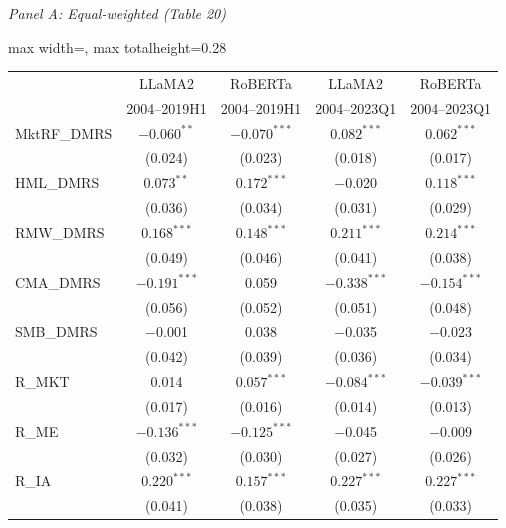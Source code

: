 \begin{table}[htbp]
{\footnotesize
\textit{Panel A: Equal-weighted (Table 20)}\\[2pt]
\begin{adjustbox}{max width=\linewidth, max totalheight=0.28\textheight}
\begin{tabular}{lcccc}
\toprule
 & LLaMA2 & RoBERTa & LLaMA2 & RoBERTa \\
 & 2004--2019H1 & 2004--2019H1 & 2004--2023Q1 & 2004--2023Q1 \\
\midrule
MktRF\_DMRS & $-0.060^{**}$ & $-0.070^{***}$ & $0.082^{***}$ & $0.062^{***}$ \\
 & \phantom{$-$}(0.024) & \phantom{$-$}(0.023) & \phantom{$-$}(0.018) & \phantom{$-$}(0.017) \\
HML\_DMRS & $0.073^{**}$ & $0.172^{***}$ & \phantom{(}$-$0.020\phantom{)} & $0.118^{***}$ \\
 & \phantom{$-$}(0.036) & \phantom{$-$}(0.034) & \phantom{$-$}(0.031) & \phantom{$-$}(0.029) \\
RMW\_DMRS & $0.168^{***}$ & $0.148^{***}$ & $0.211^{***}$ & $0.214^{***}$ \\
 & \phantom{$-$}(0.049) & \phantom{$-$}(0.046) & \phantom{$-$}(0.041) & \phantom{$-$}(0.038) \\
CMA\_DMRS & $-0.191^{***}$ & \phantom{$-$(}0.059\phantom{)} & $-0.338^{***}$ & $-0.154^{***}$ \\
 & \phantom{$-$}(0.056) & \phantom{$-$}(0.052) & \phantom{$-$}(0.051) & \phantom{$-$}(0.048) \\
SMB\_DMRS & \phantom{(}$-$0.001\phantom{)} & \phantom{$-$(}0.038\phantom{)} & \phantom{(}$-$0.035\phantom{)} & \phantom{(}$-$0.023\phantom{)} \\
 & \phantom{$-$}(0.042) & \phantom{$-$}(0.039) & \phantom{$-$}(0.036) & \phantom{$-$}(0.034) \\
R\_MKT & \phantom{$-$(}0.014\phantom{)} & $0.057^{***}$ & $-0.084^{***}$ & $-0.039^{***}$ \\
 & \phantom{$-$}(0.017) & \phantom{$-$}(0.016) & \phantom{$-$}(0.014) & \phantom{$-$}(0.013) \\
R\_ME & $-0.136^{***}$ & $-0.125^{***}$ & \phantom{(}$-$0.045\phantom{)} & \phantom{(}$-$0.009\phantom{)} \\
 & \phantom{$-$}(0.032) & \phantom{$-$}(0.030) & \phantom{$-$}(0.027) & \phantom{$-$}(0.026) \\
R\_IA & $0.220^{***}$ & $0.157^{***}$ & $0.227^{***}$ & $0.227^{***}$ \\
 & \phantom{$-$}(0.041) & \phantom{$-$}(0.038) & \phantom{$-$}(0.035) & \phantom{$-$}(0.033) \\

\end{tabular}
\end{adjustbox}}
\end{table}
